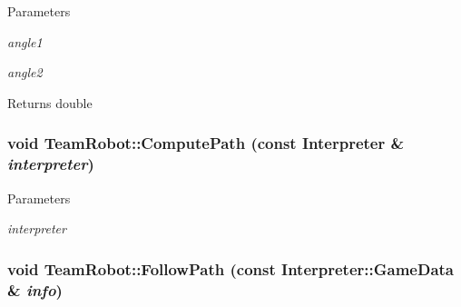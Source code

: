 \begin{DoxyParams}{Parameters}
\item[{\em angle1}]\item[{\em angle2}]\end{DoxyParams}
\begin{DoxyReturn}{Returns}
double 
\end{DoxyReturn}
\hypertarget{classTeamRobot_a9ae431d9eeaa1d16fa28c636499ab553}{
\subsubsection[{ComputePath}]{\setlength{\rightskip}{0pt plus 5cm}void TeamRobot::ComputePath (const {\bf Interpreter} \& {\em interpreter})}}
\label{classTeamRobot_a9ae431d9eeaa1d16fa28c636499ab553}

\begin{DoxyParams}{Parameters}
\item[{\em interpreter}]\end{DoxyParams}
\hypertarget{classTeamRobot_a02df00aae0a514badc93a9b2593be85f}{
\subsubsection[{FollowPath}]{\setlength{\rightskip}{0pt plus 5cm}void TeamRobot::FollowPath (const {\bf Interpreter::GameData} \& {\em info})}}
\label{classTeamRobot_a02df00aae0a514badc93a9b2593be85f}

